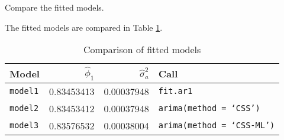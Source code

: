 \documentclass[12pt]{article}
\begin{document}
\begin{question}
Compare the fitted models.
\end{question}

\begin{solution}
The fitted models are compared in Table \ref{tab:models}.

\begin{table}[ht]
\centering
\begin{tabular}{lrrl}
  \hline
Model & $\hat{\phi}_{1}$ & $\hat{\sigma}^{2}_{a}$ & Call \\ 
  \hline
\texttt{model1} & 0.83453413 & 0.00037948 & \texttt{fit.ar1} \\ 
  \texttt{model2} & 0.83453412 & 0.00037948 & \texttt{arima(method = `CSS')} \\ 
  \texttt{model3} & 0.83576532 & 0.00038004 & \texttt{arima(method = `CSS-ML')} \\ 
   \hline
\end{tabular}
\caption{Comparison of fitted models} 
\label{tab:models}
\end{table}
\end{solution}
\end{document}
